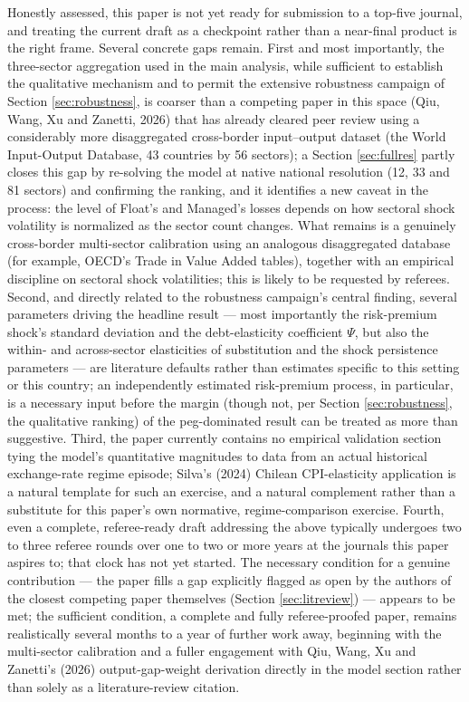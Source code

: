 \documentclass[12pt]{article}
\begin{document}
Honestly assessed, this paper is not yet ready for submission to a top-five journal, and treating the
current draft as a checkpoint rather than a near-final product is the right frame. Several concrete
gaps remain. First and most importantly, the three-sector aggregation used in the main analysis, while
sufficient to establish the qualitative mechanism and to permit the extensive robustness campaign of
Section \ref{sec:robustness}, is coarser than a competing paper in this space (Qiu, Wang, Xu and
Zanetti, 2026) that has already cleared peer review using a considerably more disaggregated
cross-border input--output dataset (the World Input-Output Database, 43 countries by 56 sectors); a
Section \ref{sec:fullres} partly closes this gap by re-solving the model at native national
resolution (12, 33 and 81 sectors) and confirming the ranking, and it identifies a new caveat in the
process: the level of Float's and Managed's losses depends on how sectoral shock volatility is
normalized as the sector count changes. What remains is a genuinely cross-border multi-sector
calibration using an analogous disaggregated database (for example, OECD's Trade in Value Added
tables), together with an empirical discipline on sectoral shock volatilities; this is likely to be
requested by referees. Second, and directly related to the robustness campaign's central finding, several
parameters driving the headline result --- most importantly the risk-premium shock's standard
deviation and the debt-elasticity coefficient $\Psi$, but also the within- and across-sector
elasticities of substitution and the shock persistence parameters --- are literature defaults rather
than estimates specific to this setting or this country; an independently estimated risk-premium
process, in particular, is a necessary input before the margin (though not, per Section
\ref{sec:robustness}, the qualitative ranking) of the peg-dominated result can be treated as more than
suggestive. Third, the paper currently contains no empirical validation section tying the model's
quantitative magnitudes to data from an actual historical exchange-rate regime episode; Silva's (2024)
Chilean CPI-elasticity application is a natural template for such an exercise, and a natural
complement rather than a substitute for this paper's own normative, regime-comparison exercise. Fourth,
even a complete, referee-ready draft addressing the above typically undergoes two to three referee
rounds over one to two or more years at the journals this paper aspires to; that clock has not yet
started. The necessary condition for a genuine contribution --- the paper fills a gap explicitly
flagged as open by the authors of the closest competing paper themselves (Section
\ref{sec:litreview}) --- appears to be met; the sufficient condition, a complete and fully
referee-proofed paper, remains realistically several months to a year of further work away, beginning
with the multi-sector calibration and a fuller engagement with Qiu, Wang, Xu and Zanetti's (2026)
output-gap-weight derivation directly in the model section rather than solely as a literature-review
citation.
\end{document}
